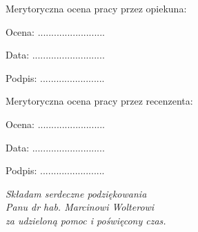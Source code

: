 Merytoryczna ocena pracy przez opiekuna:
\begin{bottompar}
\begin{minipage}[t]{7cm}
\flushleft
Ocena: .........................

Data: ...........................
\end{minipage}
\hfill
\begin{minipage}[t]{7cm}
\flushright

Podpis: ........................
\end{minipage}
\end{bottompar}

\newpage



\vspace{85mm}
\noindent
Merytoryczna ocena pracy przez recenzenta:\\

\begin{bottompar}

\begin{minipage}[t]{7cm}
\flushleft
Ocena: .........................

Data: ...........................
\end{minipage}
\hfill
\begin{minipage}[t]{7cm}
\flushright

Podpis: ........................
\end{minipage}
\end{bottompar}

\newpage



\begin{bottompar}

\begin{minipage}[t]{7cm}
\flushleft

\end{minipage}
\hfill
\begin{minipage}[t]{8cm}
\flushright
\noindent
\emph {Składam serdeczne podziękowania\\
Panu dr hab. Marcinowi Wolterowi\\
za udzieloną pomoc i poświęcony czas.}
\vspace{2cm}
\end{minipage}
\end{bottompar}